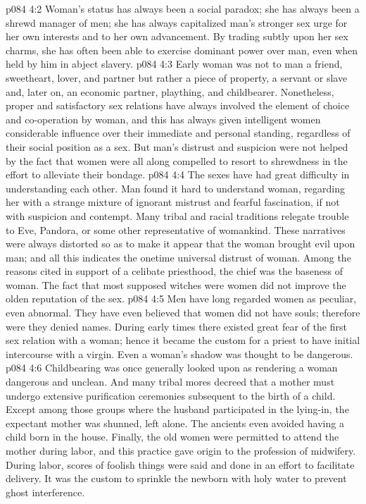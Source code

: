 \pc \vs p084 4:2 Woman’s status has always been a social paradox; she has always been a shrewd manager of men; she has always capitalized man’s stronger sex urge for her own interests and to her own advancement. By trading subtly upon her sex charms, she has often been able to exercise dominant power over man, even when held by him in abject slavery.
\vs p084 4:3 Early woman was not to man a friend, sweetheart, lover, and partner but rather a piece of property, a servant or slave and, later on, an economic partner, plaything, and childbearer. Nonetheless, proper and satisfactory sex relations have always involved the element of choice and co\hyp{}operation by woman, and this has always given intelligent women considerable influence over their immediate and personal standing, regardless of their social position as a sex. But man’s distrust and suspicion were not helped by the fact that women were all along compelled to resort to shrewdness in the effort to alleviate their bondage.
\pc \vs p084 4:4 The sexes have had great difficulty in understanding each other. Man found it hard to understand woman, regarding her with a strange mixture of ignorant mistrust and fearful fascination, if not with suspicion and contempt. Many tribal and racial traditions relegate trouble to Eve, Pandora, or some other representative of womankind. These narratives were always distorted so as to make it appear that the woman brought evil upon man; and all this indicates the onetime universal distrust of woman. Among the reasons cited in support of a celibate priesthood, the chief was the baseness of woman. The fact that most supposed witches were women did not improve the olden reputation of the sex.
\vs p084 4:5 Men have long regarded women as peculiar, even abnormal. They have even believed that women did not have souls; therefore were they denied names. During early times there existed great fear of the first sex relation with a woman; hence it became the custom for a priest to have initial intercourse with a virgin. Even a woman’s shadow was thought to be dangerous.
\vs p084 4:6 Childbearing was once generally looked upon as rendering a woman dangerous and unclean. And many tribal mores decreed that a mother must undergo extensive purification ceremonies subsequent to the birth of a child. Except among those groups where the husband participated in the lying\hyp{}in, the expectant mother was shunned, left alone. The ancients even avoided having a child born in the house. Finally, the old women were permitted to attend the mother during labor, and this practice gave origin to the profession of midwifery. During labor, scores of foolish things were said and done in an effort to facilitate delivery. It was the custom to sprinkle the newborn with holy water to prevent ghost interference.
